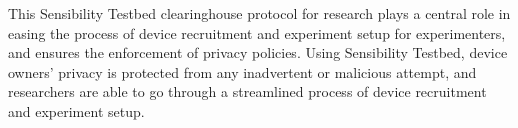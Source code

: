 
\smallskip
This Sensibility Testbed clearinghouse protocol for research plays a central role in
easing the process of device recruitment and experiment setup for experimenters, 
and ensures the enforcement of privacy policies. 
%
%
Using Sensibility Testbed, device owners' privacy is protected
from any inadvertent or malicious attempt, and researchers 
are able to go through a streamlined process of device 
recruitment and experiment setup.

